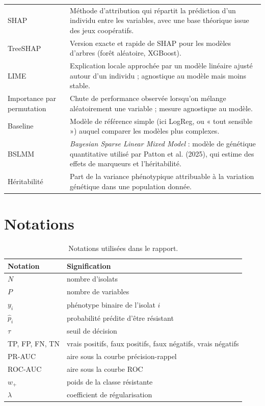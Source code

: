 \documentclass[11pt,a4paper]{article}
\begin{document}
\begin{longtable}{@{}>{\raggedright\arraybackslash}p{3.5cm}>{\raggedright\arraybackslash}p{12cm}@{}}
SHAP & Méthode d'attribution qui répartit la prédiction d'un individu entre les variables, avec une base théorique issue des jeux coopératifs. \\
TreeSHAP & Version exacte et rapide de SHAP pour les modèles d'arbres (forêt aléatoire, XGBoost). \\
LIME & Explication locale approchée par un modèle linéaire ajusté autour d'un individu ; agnostique au modèle mais moins stable. \\
Importance par permutation & Chute de performance observée lorsqu'on mélange aléatoirement une variable ; mesure agnostique au modèle. \\
Baseline & Modèle de référence simple (ici LogReg, ou « tout sensible ») auquel comparer les modèles plus complexes. \\
BSLMM & \emph{Bayesian Sparse Linear Mixed Model} : modèle de génétique quantitative utilisé par Patton et al. (2025), qui estime des effets de marqueurs et l'héritabilité. \\
Héritabilité & Part de la variance phénotypique attribuable à la variation génétique dans une population donnée. \\
\end{longtable}

\section{Notations}

\begin{table}[H]
\centering
\caption{Notations utilisées dans le rapport.}
\begin{tabular}{ll}
\toprule
\textbf{Notation} & \textbf{Signification} \\
\midrule
$N$ & nombre d'isolats \\
$P$ & nombre de variables \\
$y_i$ & phénotype binaire de l'isolat $i$ \\
$\hat p_i$ & probabilité prédite d'être résistant \\
$\tau$ & seuil de décision \\
TP, FP, FN, TN & vrais positifs, faux positifs, faux négatifs, vrais négatifs \\
PR-AUC & aire sous la courbe précision-rappel \\
ROC-AUC & aire sous la courbe ROC \\
$w_+$ & poids de la classe résistante \\
$\lambda$ & coefficient de régularisation \\
\bottomrule
\end{tabular}
\end{table}
\end{document}
